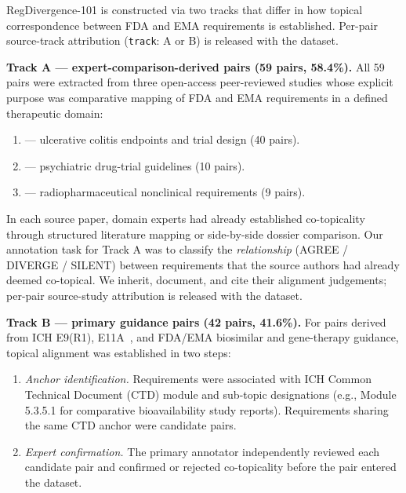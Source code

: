\documentclass[manuscript]{acmart}
\begin{document}
\begin{revblock}
RegDivergence-101 is constructed via two tracks that differ in how topical
correspondence between FDA and EMA requirements is established. Per-pair
source-track attribution (\texttt{track}: A or B) is released with the dataset.

\textbf{Track A --- expert-comparison-derived pairs (59 pairs, 58.4\%).}
All 59 pairs were extracted from three open-access peer-reviewed studies whose
explicit purpose was comparative mapping of FDA and EMA requirements in a
defined therapeutic domain:

\begin{enumerate}
\item \citet{uc2025jcc} --- ulcerative colitis endpoints and trial design
  (40 pairs).
\item \citet{pmc8157504} --- psychiatric drug-trial guidelines (10 pairs).
\item \citet{pmc6529498} --- radiopharmaceutical nonclinical requirements
  (9 pairs).
\end{enumerate}

In each source paper, domain experts had already established co-topicality
through structured literature mapping or side-by-side dossier comparison.
Our annotation task for Track A was to classify the \textit{relationship}
(AGREE / DIVERGE / SILENT) between requirements that the source authors had
already deemed co-topical. We inherit, document, and cite their alignment
judgements; per-pair source-study attribution is released with the dataset.

\textbf{Track B --- primary guidance pairs (42 pairs, 41.6\%).}
For pairs derived from ICH E9(R1), E11A~\cite{iche11a2024}, and FDA/EMA
biosimilar and gene-therapy guidance, topical alignment was established in
two steps:

\begin{enumerate}
\item \textit{Anchor identification.} Requirements were associated with ICH
  Common Technical Document (CTD) module and sub-topic designations (e.g.,
  Module 5.3.5.1 for comparative bioavailability study reports). Requirements
  sharing the same CTD anchor were candidate pairs.
\item \textit{Expert confirmation.} The primary annotator independently
  reviewed each candidate pair and confirmed or rejected co-topicality before
  the pair entered the dataset.
\end{enumerate}


\end{revblock}
\end{document}

